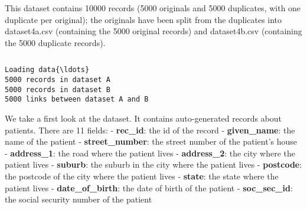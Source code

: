 \documentclass{article}
\begin{document}
    This dataset contains 10000 records (5000 originals and 5000 duplicates,
with one duplicate per original); the originals have been split from the
duplicates into dataset4a.csv (containing the 5000 original records) and
dataset4b.csv (containing the 5000 duplicate records).

    \begin{Verbatim}[commandchars=\\\{\}]

\end{Verbatim}

    \begin{Verbatim}[commandchars=\\\{\}]
Loading data{\ldots}
5000 records in dataset A
5000 records in dataset B
5000 links between dataset A and B

    \end{Verbatim}

    We take a first look at the dataset. It contains auto-generated records
about patients. There are 11 fields: - \textbf{rec\_id}: the id of the
record - \textbf{given\_name}: the name of the patient -
\textbf{street\_number}: the street number of the patient's house -
\textbf{address\_1}: the road where the patient lives -
\textbf{address\_2}: the city where the patient lives - \textbf{suburb}:
the suburb in the city where the patient lives - \textbf{postcode}: the
postcode of the city where the patient lives - \textbf{state}: the state
where the patient lives - \textbf{date\_of\_birth}: the date of birth of
the patient - \textbf{soc\_sec\_id}: the social security number of the
patient
\end{document}

